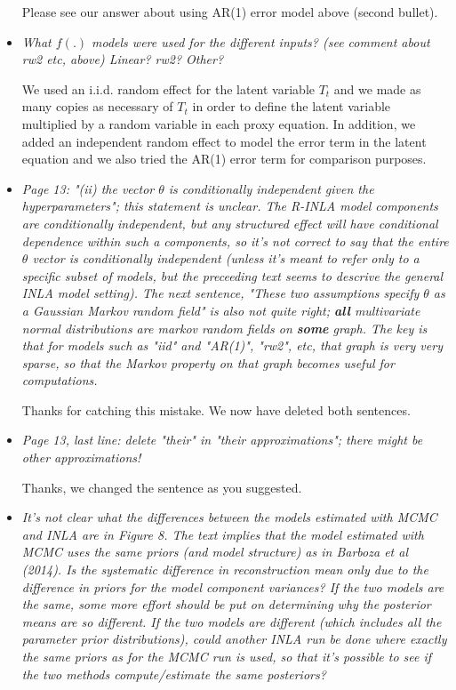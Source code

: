 \documentclass[11pt]{article}
\begin{document}
\begin{itemize}
Please see our answer about using AR(1) error model above (second bullet).

\item \textit{What $f(.)$ models were used for the different inputs? (see comment
  about rw2 etc, above) Linear? rw2? Other?}

We used an i.i.d. random effect for the latent variable $T_t$ and we made as
many copies as necessary of $T_t$ in order to define the latent variable
multiplied by a random variable in each proxy equation. In addition, we added an
independent random effect to model the error term in the latent equation and we
also tried the AR(1) error term for comparison purposes.  

\item \textit{Page 13: "(ii) the vector $\theta$ is conditionally independent given
  the hyperparameters"; this statement is unclear. The R-INLA model
  components are conditionally independent, but any structured effect
  will have conditional dependence within such a components, so it's
  not correct to say that the entire $\theta$ vector is conditionally
  independent (unless it's meant to refer only to a specific subset of
  models, but the preceeding text seems to descrive the general INLA
  model setting). The next sentence, "These two assumptions specify $\theta$ as a
  Gaussian Markov random field" is also not quite right; \textbf{all}
  multivariate normal distributions are markov random fields on \textbf{some}
  graph. The key is that for models such as "iid" and "AR(1)", "rw2",
  etc, that graph is very very sparse, so that the Markov property on
  that graph becomes useful for computations.} 

Thanks for catching this mistake. We now have deleted both sentences. 


\item \textit{Page 13, last line: delete "their" in "their approximations"; there
  might be other approximations!}
  
Thanks, we changed the sentence as you suggested.

\item \textit{It's not clear what the differences between the models estimated
  with MCMC and INLA are in Figure 8. The text implies that the model
  estimated with MCMC uses the same priors (and model structure) as in
  Barboza et al (2014). Is the systematic difference in reconstruction
  mean only due to the difference in priors for the model component
  variances?  If the two models are the same, some more effort should
  be put on determining why the posterior means are so different. If
  the two models are different (which includes all the parameter prior
  distributions), could another INLA run be done where exactly the
  same priors as for the MCMC run is used, so that it's possible to
  see if the two methods compute/estimate the same posteriors?}


\end{itemize}
\end{document}
